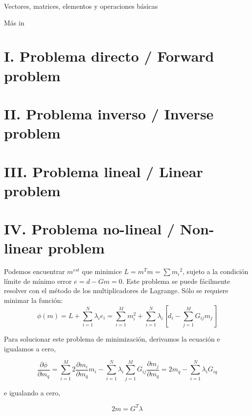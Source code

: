 \documentclass[aspectratio=169]{beamer}
\begin{document}
\begin{frame}
 {Vectores, matrices, elementos y operaciones b\'asicas}

 \begin{center}
  \Large M\'as in \cite{Menke_2018_GEO}
 \end{center}
 
\end{frame}

\section{\small I. Problema directo / Forward problem}

\section{\small II. Problema inverso / Inverse problem}

\section{\small III. Problema lineal / Linear problem}

\section{\small IV. Problema no-lineal / Non-linear problem}

\begin{frame}
 
{\color{black}Podemos encuentrar $m^{est}$ que minimice $L=m^Tm=\sum{m_i}^2$, sujeto a la condición límite de mínimo error $e = d - Gm = 0$. Este problema se puede fácilmente resolver con el método de los multiplicadores de Lagrange. Sólo se requiere minimar la función:
 \begin{equation}
  \phi(m) = L + \sum_{i=1}^N{\lambda_i e_i} = \sum_{i=1}^M m^2_i + \sum_{i=1}^N{ \lambda_i   \left[ d_i - \sum^M_{j=1} G_{ij}m_j\right]
}
\end{equation}


Para solucionar este problema de minimización, derivamos la ecuación e igualamos a cero,

\begin{equation}
 \frac{\partial\phi}{\partial m_q} = 
 \sum_{i=1}^M 2 \frac{\partial m_i}{\partial m_q} m_i - \sum_{i=1}^N \lambda_i 
 \sum_{j=1}^M {G_{ij} \frac{\partial m_j}{\partial m_q}} = 2m_q - \sum_{i=1}^N{\lambda_i G_{iq}}
\end{equation}

e igualando a cero,

\begin{equation}
 2m =  G^T \lambda
\end{equation}
}
 
\end{frame}
\end{document}
